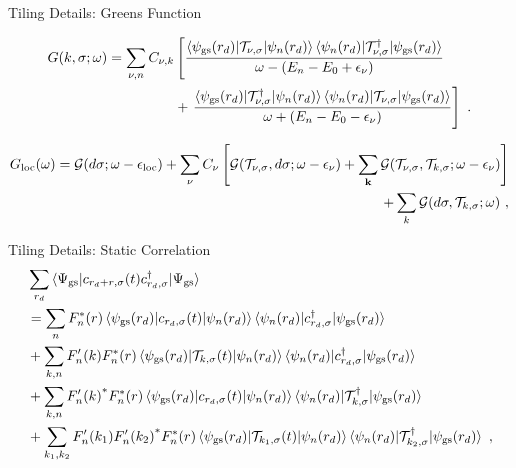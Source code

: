 \documentclass[10pt,aspectratio=169]{beamer}
\begin{document}
\begin{frame}{Tiling Details: Greens Function}

\begin{equation}\begin{aligned}
	G( k,\sigma;\omega) =  \sum_{\nu, n} C_{\nu, k} &\left[\frac{\braket{\psi_\text{gs}({ r_d}) | \mathcal{T}_{\nu,\sigma} | \psi_{n}({ r_d})}\braket{\psi_n({ r_d}) | \mathcal{T}_{\nu,\sigma}^\dagger | \psi_\text{gs}({ r_d})}}{\omega - (E_n - E_0 + \epsilon_\nu)}\right.\\
					   &+ \left.\frac{\braket{\psi_\text{gs}({ r_d}) | \mathcal{T}^\dagger_{\nu,\sigma} | \psi_{n}({ r_d})}\braket{\psi_n({ r_d}) | \mathcal{T}_{\nu,\sigma} | \psi_\text{gs}({ r_d})}}{\omega + (E_n - E_0 - \epsilon_\nu)}\right]~.
\end{aligned}\end{equation}

\begin{equation}\begin{aligned}
	G_\text{loc}(\omega) = \mathcal{G}(d\sigma; \omega - \epsilon_\text{loc}) + \sum_{\nu} C_{\nu} \left[\mathcal{G}(\mathcal{T}_{\nu,\sigma},d\sigma; \omega - \epsilon_{\nu}) + \sum_{\bf k}\mathcal{G}(\mathcal{T}_{\nu,\sigma},\mathcal{T}_{ k,\sigma}; \omega - \epsilon_{\nu})\right] \\
	+ \sum_{ k} \mathcal{G}(d\sigma,\mathcal{T}_{ k,\sigma}; \omega) ~,
\end{aligned}\end{equation}
\end{frame}

\begin{frame}{Tiling Details: Static Correlation}
\begin{equation}\begin{aligned}
&\sum_{ r_d}\braket{\Psi_\text{gs} | c_{{ r_d +  r},\sigma}(t) c^\dagger_{{ r_d},\sigma} | \Psi_\text{gs}} \\
&= \sum_{n}F_n^*( r)\braket{\psi_\text{gs}({ r_d}) |  c_{{ r_d},\sigma}(t) | \psi_{n}( r_d)} \braket{\psi_{n}( r_d) | c^\dagger_{{ r_d},\sigma} | \psi_\text{gs}({ r_d})}\\
																													  &+ \sum_{ k, n}F^\prime_n( k)F_n^*( r)\braket{\psi_\text{gs}({ r_d}) | \mathcal{T}_{ k,\sigma}(t) | \psi_{n}( r_d)} \braket{\psi_{n}( r_d) | c^\dagger_{{ r_d},\sigma} | \psi_\text{gs}({ r_d})}\\
																													  &+ \sum_{ k, n}{F^\prime_n( k)}^*F_n^*( r)\braket{\psi_\text{gs}({ r_d}) | c_{ r_d,\sigma}(t) | \psi_{n}( r_d)} \braket{\psi_{n}( r_d) | \mathcal{T}^\dagger_{ k,\sigma} | \psi_\text{gs}({ r_d})}\\
																													  &+\sum_{ k_1, k_2}F^\prime_n( k_1){F^\prime_n( k_2)}^*F_n^*( r)\braket{\psi_\text{gs}({ r_d}) | \mathcal{T}_{ k_1,\sigma}(t) | \psi_{n}( r_d)} \braket{\psi_{n}( r_d) | \mathcal{T}^\dagger_{ k_2,\sigma} | \psi_\text{gs}({ r_d})}~,
\end{aligned}\end{equation}
\end{frame}
\end{document}
